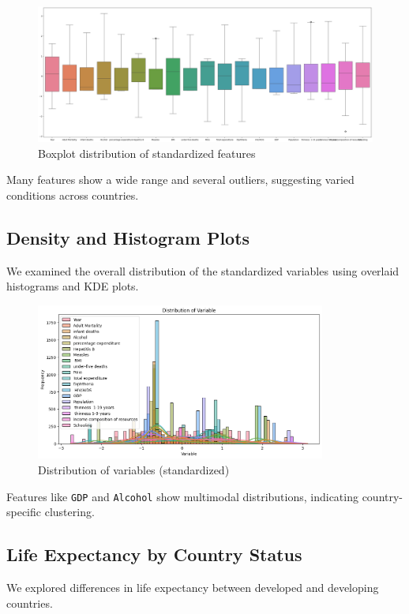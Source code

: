 \documentclass[11pt]{article}
\begin{document}
\begin{figure}[H]
    \centering
    \includegraphics[width=\textwidth]{output.png}
    \caption{Boxplot distribution of standardized features}
\end{figure}

Many features show a wide range and several outliers, suggesting varied conditions across countries.

\subsection{Density and Histogram Plots}
We examined the overall distribution of the standardized variables using overlaid histograms and KDE plots.

\begin{figure}[H]
    \centering
    \includegraphics[width=0.85\textwidth]{output2.png}
    \caption{Distribution of variables (standardized)}
\end{figure}

Features like \texttt{GDP} and \texttt{Alcohol} show multimodal distributions, indicating country-specific clustering.

\subsection{Life Expectancy by Country Status}
We explored differences in life expectancy between developed and developing countries.
\end{document}
